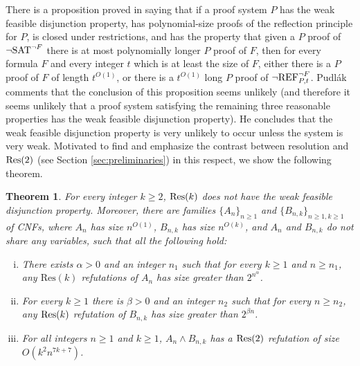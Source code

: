 \documentclass[10pt,a4paper]{article}
\newtheorem{theorem}{Theorem}
\theoremstyle{remark}
\newtheorem*{switching lemma}{Switching Lemma}
\newtheorem*{open problem}{Open Problem}
\theoremstyle{definition}
\begin{document}
There is a proposition proved in \cite{Pudlak2003} saying that if a proof system $P$ has the weak feasible disjunction property, has polynomial-size proofs of the reflection principle for $P$, is closed under restrictions, and has the property that given a $P$ proof of $\neg \textnormal{SAT}^{\neg F}$ there is at most polynomially longer $P$ proof of $F$, then for every formula $F$ and every integer $t$ which is at least the size of $F$, either there is a $P$ proof of $F$ of length $t^{O(1)}$, or there is a $t^{O(1)}$ long $P$ proof of $\neg \textnormal{REF}^{\neg F}_{P,t}$. Pudl\'ak comments that the conclusion of this proposition seems unlikely (and therefore it seems unlikely that a proof system satisfying the remaining three reasonable properties has the weak feasible disjunction property). He concludes that the weak feasible disjunction property is very unlikely to occur unless the system is very weak. Motivated to find and emphasize the contrast between resolution and $\textnormal{Res}(2)$ (see Section \ref{sec:preliminaries}) in this respect, we show the following theorem.


\begin{theorem}
\label{thm:res(k)-no-wfdp}
For every integer $k \geq 2$, $\textnormal{Res}(k)$ does not have the weak feasible disjunction property. Moreover, there are families $\{A_n\}_{n \geq 1}$ and $\{B_{n,k}\}_{n \geq 1, k \geq 1}$ of CNFs, where $A_n$ has size $n^{O(1)}$, $B_{n,k}$ has size $n^{O(k)}$, and $A_n$ and  $B_{n,k}$ do not share any variables, such that all the following hold:
\begin{enumerate}[(i)]
\item \label{item:lower_bound_on_A_n} There exists $\alpha > 0$ and an integer $n_1$ such that for every $k \geq 1$ and $n \geq n_1$, any $\text{Res}(k)$ refutations of $A_n$ has size greater than $2^{n^{\alpha}}$.
\item \label{item:lower_bound_on_B_n} For every $k \geq 1$ there is $\beta > 0$ and an integer $n_2$ such that for every $n \geq n_2$, any $\textnormal{Res}(k)$ refutation of $B_{n,k}$ has size greater than $2^{\beta n}$. 
\item \label{item:upper_bound_on_A_n_and_B_n} For all integers $n \geq 1$ and $k \geq 1$, $A_n \land B_{n,k}$ has a $\textnormal{Res}(2)$ refutation of size $O(k^2 n^{7k+7})$.
\end{enumerate}
\end{theorem}
\end{document}
